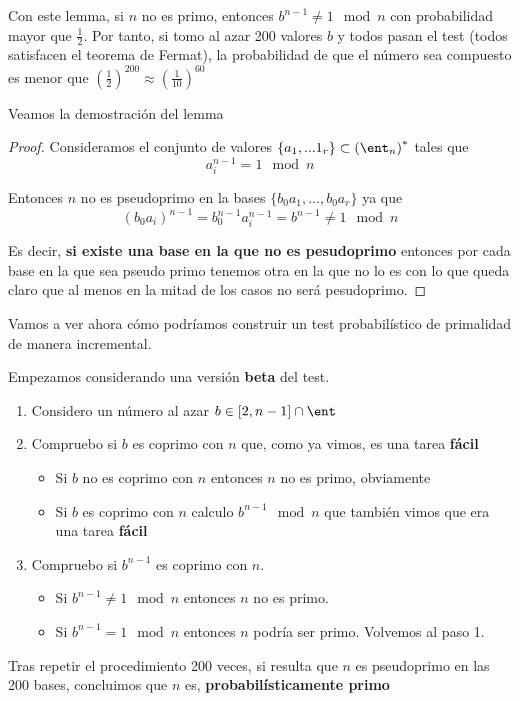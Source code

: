 Con este lemma, si $n$ no es primo, entonces $b^{n-1} \neq 1 \mod n$ con probabilidad mayor que $\frac{1}{2}$. Por tanto, si tomo al azar 200 valores $b$ y todos pasan el test (todos satisfacen el teorema de Fermat), la probabilidad de que el número sea compuesto es menor que $\left( \frac{1}{2}\right)^{200} \approx \left(\frac{1}{10}\right)^{60}$

Veamos la demostración del lemma
\begin{proof}
Consideramos el conjunto de valores $\{a_1,...1_r\} \subset \left(\ent_n\right)^*$ tales que
\[a_i^{n-1} = 1 \mod n\]

Entonces $n$ no es pseudoprimo en la bases $\{b_0a_1,...,b_0a_r\}$ ya que
\[(b_0a_i)^{n-1} = b_0^{n-1}a_i^{n-1} = b^{n-1} \neq 1 \mod n\]

Es decir, \textbf{si existe una base en la que no es pesudoprimo} entonces por cada base en la que sea pseudo primo tenemos otra en la que no lo es con lo que queda claro que al menos en la mitad de los casos no será pesudoprimo.
\end{proof}

Vamos a ver ahora cómo podríamos construir un test probabilístico de primalidad de manera incremental.

Empezamos considerando una versión \textbf{beta} del test.
\begin{enumerate}
\item Considero un número al azar $b \in [2,n-1]\cap \ent$
\item Compruebo si $b$ es coprimo con $n$ que, como ya vimos, es una tarea \textbf{fácil}
\begin{itemize}
\item Si $b$ no es coprimo con $n$ entonces $n$ no es primo, obviamente
\item Si $b$ es coprimo con $n$ calculo $b^{n-1} \mod n$ que también vimos que era una tarea \textbf{fácil}
\end{itemize}
\item Compruebo si $b^{n-1}$ es coprimo con $n$.
\begin{itemize}
\item Si $b^{n-1}\neq 1 \mod n$ entonces $n$ no es primo.
\item Si $b^{n-1} = 1 \mod n$ entonces $n$ podría ser primo. Volvemos al paso 1.
\end{itemize}
\end{enumerate}

Tras repetir el procedimiento 200 veces, si resulta que $n$ es pseudoprimo en las 200 bases, concluimos que $n$ es, \textbf{probabilísticamente primo}

